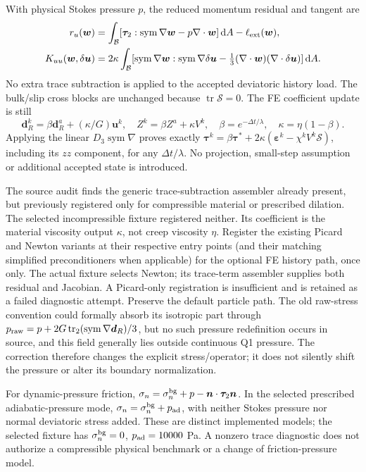 \documentclass[11pt,a4paper]{article}
\newcommand{\B}{\mathcal B}
\newcommand{\Smat}{\bm{\mathcal S}}
\newcommand{\strain}{\bm\varepsilon}
\newcommand{\tauv}{\bm\tau}
\newcommand{\dd}{\,\mathrm d}
\newcommand{\sym}{\operatorname{sym}}
\begin{document}
With physical Stokes pressure $p$, the reduced momentum residual and tangent are
\begin{align}
 r_u(\bm w)&=\int_\B[\tauv_2:\sym\nabla\bm w-p\nabla\cdot\bm w]\dd A
              -\ell_{\rm ext}(\bm w),\\
 K_{uu}(\bm w,\delta\bm u)&=2\kappa\int_\B
   [\sym\nabla\bm w:\sym\nabla\delta\bm u
    -\tfrac13(\nabla\cdot\bm w)(\nabla\cdot\delta\bm u)]\dd A.
\end{align}
No extra trace subtraction is applied to the accepted deviatoric history load.
The bulk/slip cross blocks are unchanged because $\operatorname{tr}\Smat=0$.
The FE coefficient update is still
\[
 \bm d_R^k=\beta\bm d_R^a+(\kappa/G)\bm u^k,
 \quad Z^k=\beta Z^a+\kappa V^k,
 \quad\beta=e^{-\Delta t/\lambda},\quad\kappa=\eta(1-\beta).
\]
Applying the linear $D_3\sym\nabla$ proves exactly
$\tauv^k=\beta\tauv^*+2\kappa(\strain^k-\chi^kV^k\Smat)$, including its
$zz$ component, for any $\Delta t/\lambda$. No projection, small-step assumption
or additional accepted state is introduced.

The source audit finds the generic trace-subtraction assembler already present,
but previously registered only for compressible material or prescribed dilation.
The selected incompressible fixture registered neither. Its coefficient is the
material viscosity output $\kappa$, not creep viscosity $\eta$. Register the existing Picard and Newton variants at their respective entry
points (and their matching simplified preconditioners when applicable)
for the optional FE history path, once only. The actual fixture selects Newton;
its trace-term assembler supplies both residual and Jacobian. A Picard-only
registration is insufficient and is retained as a failed diagnostic attempt.
Preserve the default particle path.
The old raw-stress convention could formally absorb its isotropic part through
$p_{\rm raw}=p+2G\operatorname{tr}_2(\sym\nabla\bm d_R)/3$, but no such pressure
redefinition occurs in source, and this field generally lies outside continuous
Q1 pressure. The correction therefore changes the explicit stress/operator;
it does not silently shift the pressure or alter its boundary normalization.

For dynamic-pressure friction, $\sigma_n=\sigma_n^{\rm bg}+p-
\bm n\cdot\tauv_2\bm n$. In the selected prescribed adiabatic-pressure mode,
$\sigma_n=\sigma_n^{\rm bg}+p_{\rm ad}$, with neither Stokes pressure nor
normal deviatoric stress added. These are distinct implemented models; the
selected fixture has $\sigma_n^{\rm bg}=0$, $p_{\rm ad}=10000$ Pa. A nonzero
trace diagnostic does not authorize a compressible physical benchmark or a
change of friction-pressure model.
\end{document}
